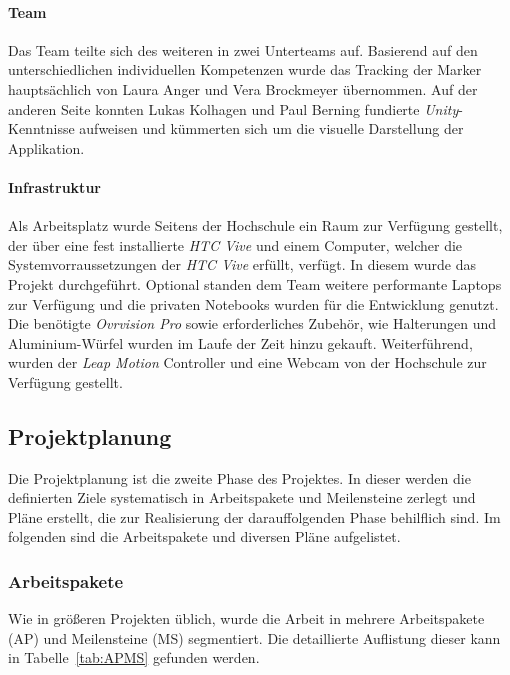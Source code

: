 \paragraph{Team} Das Team teilte sich des weiteren in zwei Unterteams auf. Basierend auf den unterschiedlichen individuellen Kompetenzen wurde das Tracking der Marker hauptsächlich von Laura Anger und Vera Brockmeyer übernommen. Auf der anderen Seite konnten Lukas Kolhagen und Paul Berning fundierte \emph{Unity}-Kenntnisse aufweisen und kümmerten sich um die visuelle Darstellung der Applikation.

\paragraph{Infrastruktur} Als Arbeitsplatz wurde Seitens der Hochschule ein Raum zur Verfügung gestellt, der über eine fest installierte \textit{HTC Vive} und einem Computer, welcher die Systemvorraussetzungen der \textit{HTC Vive} erfüllt, verfügt. In diesem wurde das Projekt durchgeführt. Optional standen dem Team weitere performante Laptops zur Verfügung und die privaten Notebooks wurden für die Entwicklung genutzt. Die benötigte \textit{Ovrvision Pro} sowie erforderliches Zubehör, wie Halterungen und Aluminium-Würfel wurden im Laufe der Zeit hinzu gekauft. Weiterführend, wurden der \textit{Leap Motion} Controller und eine Webcam von der Hochschule zur Verfügung gestellt.
\subsection{Projektplanung}
Die Projektplanung ist die zweite Phase des Projektes. In dieser werden die definierten Ziele systematisch in Arbeitspakete und Meilensteine zerlegt und Pläne erstellt, die zur Realisierung der darauffolgenden Phase behilflich sind. Im folgenden sind die Arbeitspakete und diversen Pläne aufgelistet.
\subsubsection{Arbeitspakete}
Wie in größeren Projekten üblich, wurde die Arbeit in mehrere Arbeitspakete (AP) und Meilensteine (MS) segmentiert. Die detaillierte Auflistung dieser kann in Tabelle~\ref{tab:APMS} gefunden werden.

